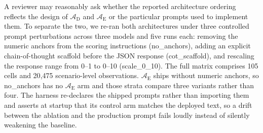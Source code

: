\documentclass[a4paper,fleqn]{cas-dc}
\begin{document}
A reviewer may reasonably ask whether the reported architecture ordering reflects the design of $\mathcal{A}_{\text{D}}$ and $\mathcal{A}_{\text{E}}$ or the particular prompts used to implement them. To separate the two, we re-ran both architectures under three controlled prompt perturbations across three models and five runs each: removing the numeric anchors from the scoring instructions (no\_anchors), adding an explicit chain-of-thought scaffold before the JSON response (cot\_scaffold), and rescaling the response range from 0--1 to 0--10 (scale\_0\_10). The full matrix comprises 105 cells and 20{,}475 scenario-level observations. $\mathcal{A}_{\text{E}}$ ships without numeric anchors, so no\_anchors has no $\mathcal{A}_{\text{E}}$ arm and those strata compare three variants rather than four. The harness re-declares the shipped prompts rather than importing them and asserts at startup that its control arm matches the deployed text, so a drift between the ablation and the production prompt fails loudly instead of silently weakening the baseline.
\end{document}
